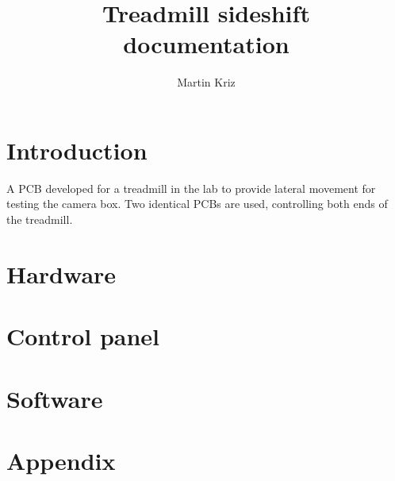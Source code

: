 \documentclass{ol-softwaremanual}
\title{Treadmill sideshift \\ documentation}
\author{Martin Kriz}
\begin{document}
\maketitle

\tableofcontents
\listoflistings
\newpage

\section{Introduction}

A PCB developed for a treadmill in the lab to provide lateral movement for testing the camera box. Two identical PCBs are used, controlling both ends of the treadmill.

\newpage
\section{Hardware}



\newpage
\section{Control panel}


\newpage
\section{Software}



\newpage
\section{Appendix}


\end{document}
